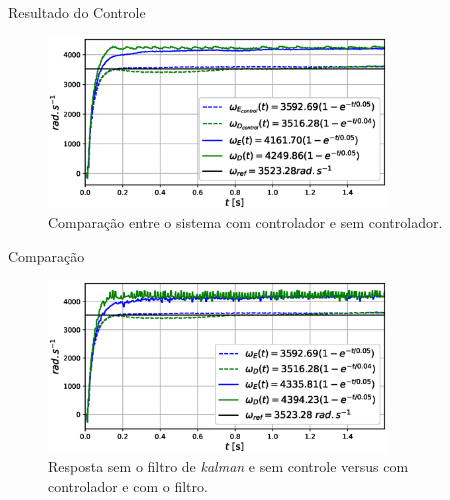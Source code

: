 \begin{frame}{Resultado do Controle}

    \begin{figure}
        \centering
        \includegraphics[width=0.8\textwidth]{figuras/resultados/exp03/controlador_vs_sem_controlador100.eps}
        \caption{Comparação entre o sistema com controlador e sem controlador.}
    \end{figure}
    
\end{frame}

\begin{frame}{Comparação}
    \begin{figure}
        \centering
        \includegraphics[width=0.8\textwidth]{figuras/resultados/exp03/antes_vs_depois100.eps}
        \caption{Resposta sem o filtro de \emph{kalman} e sem controle versus com controlador e com o filtro.}
    \end{figure}
\end{frame}
